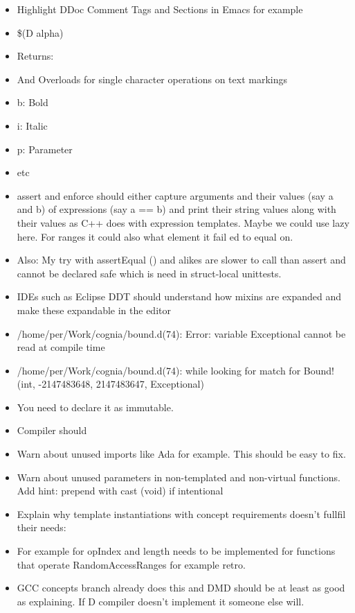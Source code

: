 \documentclass[xcolor=dvipsnames, twocolumn]{article}
\begin{document}
\begin{itemize}
\item Highlight DDoc Comment Tags and Sections in Emacs for example
\item \$(D alpha)
\item Returns:
\item And Overloads for single character operations on text markings
\item b: Bold
\item i: Italic
\item p: Parameter
\item etc
\item assert and enforce should either capture arguments and their values (say a
  and b) of expressions (say a == b) and print their string values along with
  their values as C++ does with expression templates. Maybe we could use lazy
  here. For ranges it could also what element it fail ed to equal on.
\item Also: My try with assertEqual () and alikes are slower to call than assert
  and cannot be declared safe which is need in struct-local unittests.
\item IDEs such as Eclipse DDT should understand how mixins are expanded and
  make these expandable in the editor
\item /home/per/Work/cognia/bound.d(74): Error: variable Exceptional cannot be
  read at compile time
\item /home/per/Work/cognia/bound.d(74): while looking for match for Bound!(int,
  -2147483648, 2147483647, Exceptional)
\item You need to declare it as immutable.
\item Compiler should
\item Warn about unused imports like Ada for example. This should be easy to
  fix.
\item Warn about unused parameters in non-templated and non-virtual
  functions. Add hint: prepend with cast (void) if intentional
\item Explain why template instantiations with concept requirements doesn’t
  fullfil their needs:
\item For example for opIndex and length needs to be implemented for functions
  that operate RandomAccessRanges for example retro.
\item GCC concepts branch already does this and DMD should be at least as good
  as explaining. If D compiler doesn’t implement it someone else will.
\end{itemize}
\end{document}
